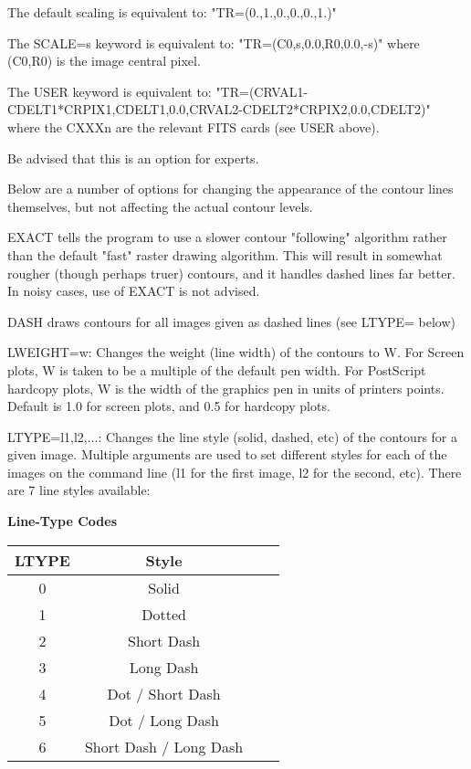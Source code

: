The default scaling is equivalent to:  "TR=(0.,1.,0.,0.,0.,1.)"
 
The SCALE=s keyword is equivalent to: "TR=(C0,s,0.0,R0,0.0,-s)" where
(C0,R0) is the image central pixel.
 
The USER keyword is equivalent to:
"TR=(CRVAL1-CDELT1*CRPIX1,CDELT1,0.0,CRVAL2-CDELT2*CRPIX2,0.0,CDELT2)"
where the CXXXn are the relevant FITS cards (see USER above).
 
Be advised that this is an option for experts.


Below are a number of options for changing the appearance of the contour
lines themselves, but not affecting the actual contour levels.
 
EXACT tells the program to use a slower contour "following" algorithm
rather than the default "fast" raster drawing algorithm.  This will result
in somewhat rougher (though perhaps truer) contours, and it handles dashed
lines far better.  In noisy cases, use of EXACT is not advised.
 
DASH draws contours for all images given as dashed lines (see LTYPE= below)
 
LWEIGHT=w: Changes the weight (line width) of the contours to W.  For
Screen plots, W is taken to be a multiple of the default pen width.  For
PostScript hardcopy plots, W is the width of the graphics pen in units of
printers points.  Default is 1.0 for screen plots, and 0.5 for hardcopy
plots.
 
LTYPE=l1,l2,...: Changes the line style (solid, dashed, etc) of the
contours for a given image.  Multiple arguments are used to set different
styles for each of the images on the command line (l1 for the first image,
l2 for the second, etc).  There are 7 line styles available:

\begin{center}
{\bf Line-Type Codes}\\
\begin{tabular}{cccc}
\hline
LTYPE & Style \\
\hline
0 & Solid    \\   
1 & Dotted     \\       
2 & Short Dash   \\     
3 & Long Dash\\
4 & Dot / Short Dash\\
5 & Dot / Long Dash\\
6 & Short Dash / Long Dash\\
\hline
\end{tabular}
\end{center}

